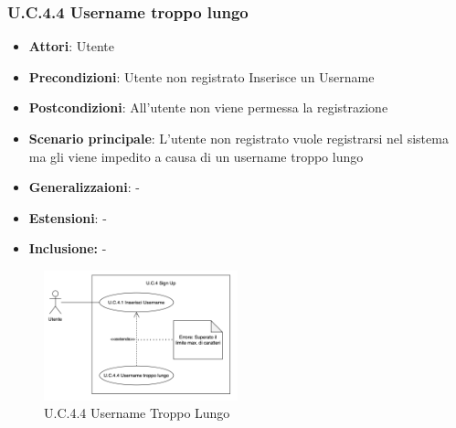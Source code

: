 \subsubsection{U.C.4.4 Username troppo lungo}
\begin{itemize}
    \item \textbf{Attori}: Utente
    \item \textbf{Precondizioni}: Utente non registrato Inserisce un Username
    \item \textbf{Postcondizioni}: All'utente non viene permessa la registrazione
    \item \textbf{Scenario principale}: L’utente non registrato vuole registrarsi nel sistema ma gli viene impedito a causa di un username troppo lungo
    \item \textbf{Generalizzaioni}: -
    \item \textbf{Estensioni}: -
    \item \textbf{Inclusione:} -
\end{itemize}
\begin{figure}[h!]
    \centering
    \includegraphics[width=0.5\textwidth]{img/UC4-4.png}
    \caption{U.C.4.4 Username Troppo Lungo}
\end{figure}
\newpage
